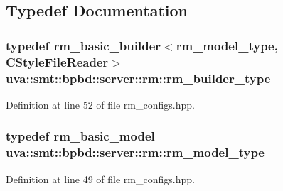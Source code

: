 \subsection{Typedef Documentation}
\hypertarget{namespaceuva_1_1smt_1_1bpbd_1_1server_1_1rm_aa3336306eb718435686eba64bdd7685e}{}
\subsubsection[{rm\+\_\+builder\+\_\+type}]{\setlength{\rightskip}{0pt plus 5cm}typedef {\bf rm\+\_\+basic\+\_\+builder}$<${\bf rm\+\_\+model\+\_\+type}, {\bf C\+Style\+File\+Reader}$>$ {\bf uva\+::smt\+::bpbd\+::server\+::rm\+::rm\+\_\+builder\+\_\+type}}\label{namespaceuva_1_1smt_1_1bpbd_1_1server_1_1rm_aa3336306eb718435686eba64bdd7685e}


Definition at line 52 of file rm\+\_\+configs.\+hpp.

\hypertarget{namespaceuva_1_1smt_1_1bpbd_1_1server_1_1rm_a4d0c6c248c7451ba74697118cc6efa00}{}
\subsubsection[{rm\+\_\+model\+\_\+type}]{\setlength{\rightskip}{0pt plus 5cm}typedef {\bf rm\+\_\+basic\+\_\+model} {\bf uva\+::smt\+::bpbd\+::server\+::rm\+::rm\+\_\+model\+\_\+type}}\label{namespaceuva_1_1smt_1_1bpbd_1_1server_1_1rm_a4d0c6c248c7451ba74697118cc6efa00}


Definition at line 49 of file rm\+\_\+configs.\+hpp.

